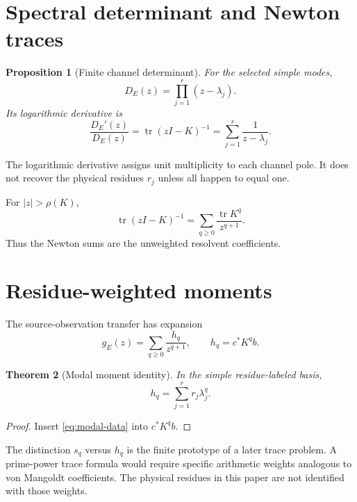 \documentclass[12pt]{article}
\newtheorem{theorem}{Theorem}[section]
\newtheorem{proposition}[theorem]{Proposition}
\theoremstyle{remark}
\begin{document}
\section{Spectral determinant and Newton traces}

\begin{proposition}[Finite channel determinant]\label{prop:determinant}
For the selected simple modes,
\begin{equation}\label{eq:determinant}
 D_E(z)=\prod_{j=1}^r(z-\lambda_j).
\end{equation}
Its logarithmic derivative is
\begin{equation}\label{eq:log-derivative}
 \frac{D_E'(z)}{D_E(z)}
 =\operatorname{tr}(zI-K)^{-1}
 =\sum_{j=1}^r\frac{1}{z-\lambda_j}.
\end{equation}
\end{proposition}

The logarithmic derivative assigns unit multiplicity to each channel pole.
It does not recover the physical residues $r_j$ unless all happen to equal
one.

For $|z|>\rho(K)$,
\begin{equation}\label{eq:trace-expansion}
 \operatorname{tr}(zI-K)^{-1}
 =\sum_{q\ge0}\frac{\operatorname{tr}K^q}{z^{q+1}}.
\end{equation}
Thus the Newton sums are the unweighted resolvent coefficients.

\section{Residue-weighted moments}

The source-observation transfer has expansion
\begin{equation}\label{eq:weighted-expansion}
 g_E(z)=\sum_{q\ge0}\frac{h_q}{z^{q+1}},
 \qquad h_q=c^*K^qb.
\end{equation}

\begin{theorem}[Modal moment identity]\label{thm:moments}
In the simple residue-labeled basis,
\begin{equation}\label{eq:modal-moments}
 \boxed{h_q=\sum_{j=1}^r r_j\lambda_j^q.}
\end{equation}
\end{theorem}

\begin{proof}
Insert \eqref{eq:modal-data} into $c^*K^qb$.
\end{proof}

The distinction $s_q$ versus $h_q$ is the finite prototype of a later trace
problem.  A prime-power trace formula would require specific arithmetic
weights analogous to von Mangoldt coefficients.  The physical residues in
this paper are not identified with those weights.
\end{document}
